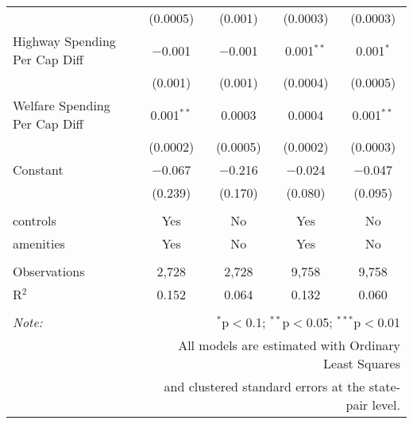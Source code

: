 \begin{table}[!htbp]
\begin{tabular}{@{\extracolsep{5pt}}lcccc}
  & (0.0005) & (0.001) & (0.0003) & (0.0003) \\ 
  Highway Spending Per Cap Diff & $-$0.001 & $-$0.001 & 0.001$^{**}$ & 0.001$^{*}$ \\ 
  & (0.001) & (0.001) & (0.0004) & (0.0005) \\ 
  Welfare Spending Per Cap Diff & 0.001$^{**}$ & 0.0003 & 0.0004 & 0.001$^{**}$ \\ 
  & (0.0002) & (0.0005) & (0.0002) & (0.0003) \\ 
  Constant & $-$0.067 & $-$0.216 & $-$0.024 & $-$0.047 \\ 
  & (0.239) & (0.170) & (0.080) & (0.095) \\ 
 \hline \\[-1.8ex] 
controls & Yes & No & Yes & No \\ 
amenities & Yes & No & Yes & No \\ 
\hline \\[-1.8ex] 
Observations & 2,728 & 2,728 & 9,758 & 9,758 \\ 
R$^{2}$ & 0.152 & 0.064 & 0.132 & 0.060 \\ 
\hline 
\hline \\[-1.8ex] 
\textit{Note:}  & \multicolumn{4}{r}{$^{*}$p$<$0.1; $^{**}$p$<$0.05; $^{***}$p$<$0.01} \\ 
 & \multicolumn{4}{r}{All models are estimated with Ordinary Least Squares} \\ 
 & \multicolumn{4}{r}{and clustered standard errors at the state-pair level.} \\ 
\end{tabular} 
\end{table} 
